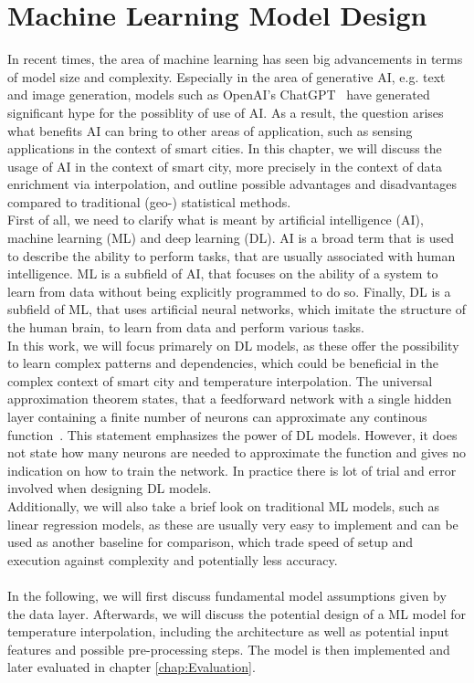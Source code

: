 \chapter{Machine Learning Model Design}
\label{chap:Machine Learning Model Design}

In recent times, the area of machine learning has seen big advancements in terms of model size and complexity. Especially in the area of generative AI, e.g. text and image generation, models such as OpenAI's ChatGPT~\cite{openai2023gpt4} have generated significant hype for the possiblity of use of AI. As a result, the question arises what benefits AI can bring to other areas of application, such as sensing applications in the context of smart cities. In this chapter, we will discuss the usage of AI in the context of smart city, more precisely in the context of data enrichment via interpolation, and outline possible advantages and disadvantages compared to traditional (geo-) statistical methods.\\
First of all, we need to clarify what is meant by artificial intelligence (AI), machine learning (ML) and deep learning (DL). AI is a broad term that is used to describe the ability to perform tasks, that are usually associated with human intelligence. ML is a subfield of AI, that focuses on the ability of a system to learn from data without being explicitly programmed to do so. Finally, DL is a subfield of ML, that uses artificial neural networks, which imitate the structure of the human brain, to learn from data and perform various tasks.\\
In this work, we will focus primarely on DL models, as these offer the possibility to learn complex patterns and dependencies, which could be beneficial in the complex context of smart city and temperature interpolation. The universal approximation theorem states, that a feedforward network with a single hidden layer containing a finite number of neurons can approximate any continous function~\cite{hornik1989multilayer}. This statement emphasizes the power of DL models. However, it does not state how many neurons are needed to approximate the function and gives no indication on how to train the network. In practice there is lot of trial and error involved when designing DL models.\\
Additionally, we will also take a brief look on traditional ML models, such as linear regression models, as these are usually very easy to implement and can be used as another baseline for comparison, which trade speed of setup and execution against complexity and potentially less accuracy.\\
\\
In the following, we will first discuss fundamental model assumptions given by the data layer. Afterwards, we will discuss the potential design of a ML model for temperature interpolation, including the architecture as well as potential input features and possible pre-processing steps. The model is then implemented and later evaluated in chapter \ref{chap:Evaluation}.

